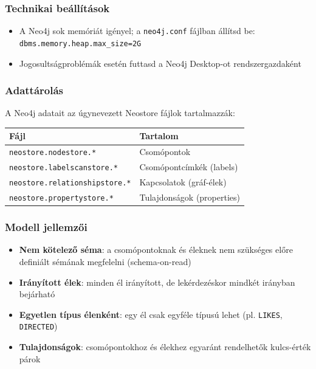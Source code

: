 \documentclass[
  magyar,
]{article}
\providecommand{\tightlist}{%
  \setlength{\itemsep}{0pt}\setlength{\parskip}{0pt}}
\begin{document}
\subsubsection{Technikai
beállítások}\label{technikai-beuxe1lluxedtuxe1sok}

\begin{itemize}
\tightlist
\item
  A Neo4j sok memóriát igényel; a \texttt{neo4j.conf} fájlban állítsd
  be:\\
  \texttt{dbms.memory.heap.max\_size=2G}
\item
  Jogosultságproblémák esetén futtasd a Neo4j Desktop-ot
  rendszergazdaként
\end{itemize}

\subsubsection{Adattárolás}\label{adattuxe1roluxe1s}

A Neo4j adatait az úgynevezett Neostore fájlok tartalmazzák:

\begin{longtable}[]{@{}ll@{}}
\toprule\noalign{}
Fájl & Tartalom \\
\midrule\noalign{}
\endhead
\bottomrule\noalign{}
\endlastfoot
\texttt{neostore.nodestore.*} & Csomópontok \\
\texttt{neostore.labelscanstore.*} & Csomópontcímkék (labels) \\
\texttt{neostore.relationshipstore.*} & Kapcsolatok (gráf-élek) \\
\texttt{neostore.propertystore.*} & Tulajdonságok (properties) \\
\end{longtable}

\subsubsection{Modell jellemzői}\label{modell-jellemzux151i}

\begin{itemize}
\tightlist
\item
  \textbf{Nem kötelező séma}: a csomópontoknak és éleknek nem szükséges
  előre definiált sémának megfelelni (schema-on-read)
\item
  \textbf{Irányított élek}: minden él irányított, de lekérdezéskor
  mindkét irányban bejárható
\item
  \textbf{Egyetlen típus élenként}: egy él csak egyféle típusú lehet
  (pl. \texttt{LIKES}, \texttt{DIRECTED})
\item
  \textbf{Tulajdonságok}: csomópontokhoz és élekhez egyaránt rendelhetők
  kulcs-érték párok
\end{itemize}
\end{document}
